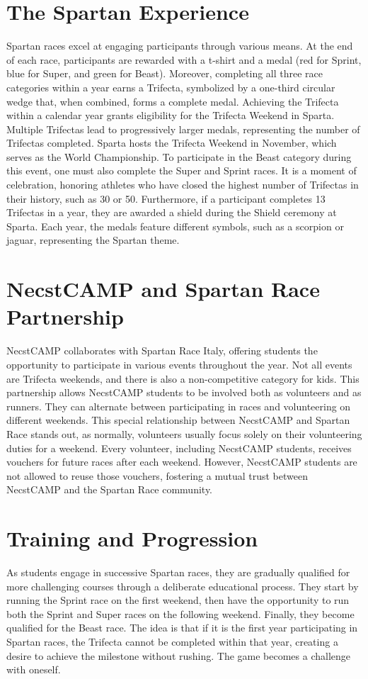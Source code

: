\documentclass[12pt,oneside,a4paper]{article}
\begin{document}
\section{The Spartan Experience} \label{sec:spexp}
Spartan races excel at engaging participants through various means. At the end of each race, participants are rewarded with a t-shirt and a medal (red for Sprint, blue for Super, and green for Beast). Moreover, completing all three race categories within a year earns a Trifecta, symbolized by a one-third circular wedge that, when combined, forms a complete medal. Achieving the Trifecta within a calendar year grants eligibility for the Trifecta Weekend in Sparta. Multiple Trifectas lead to progressively larger medals, representing the number of Trifectas completed. Sparta hosts the Trifecta Weekend in November, which serves as the World Championship. To participate in the Beast category during this event, one must also complete the Super and Sprint races. It is a moment of celebration, honoring athletes who have closed the highest number of Trifectas in their history, such as 30 or 50. Furthermore, if a participant completes 13 Trifectas in a year, they are awarded a shield during the Shield ceremony at Sparta. Each year, the medals feature different symbols, such as a scorpion or jaguar, representing the Spartan theme.

\section{NecstCAMP and Spartan Race Partnership} \label{sec:partn}
NecstCAMP collaborates with Spartan Race Italy, offering students the opportunity to participate in various events throughout the year. Not all events are Trifecta weekends, and there is also a non-competitive category for kids. This partnership allows NecstCAMP students to be involved both as volunteers and as runners. They can alternate between participating in races and volunteering on different weekends. This special relationship between NecstCAMP and Spartan Race stands out, as normally, volunteers usually focus solely on their volunteering duties for a weekend. 
Every volunteer, including NecstCAMP students, receives vouchers for future races after each weekend. However, NecstCAMP students are not allowed to reuse those vouchers, fostering a mutual trust between NecstCAMP and the Spartan Race community.

\section{Training and Progression} \label{sec:prog}
As students engage in successive Spartan races, they are gradually qualified for more challenging courses through a deliberate educational process. They start by running the Sprint race on the first weekend, then have the opportunity to run both the Sprint and Super races on the following weekend. Finally, they become qualified for the Beast race. The idea is that if it is the first year participating in Spartan races, the Trifecta cannot be completed within that year, creating a desire to achieve the milestone without rushing. The game becomes a challenge with oneself.
\end{document}
